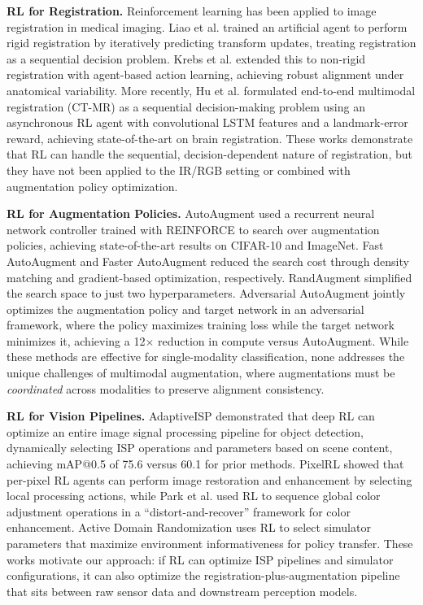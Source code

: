 \documentclass[12pt]{article}
\begin{document}
\textbf{RL for Registration.} Reinforcement learning has been applied to image registration in medical imaging. Liao et al. \citep{Liao2017ArtificialAgent} trained an artificial agent to perform rigid registration by iteratively predicting transform updates, treating registration as a sequential decision problem. Krebs et al. \citep{Krebs2017RobustRL} extended this to non-rigid registration with agent-based action learning, achieving robust alignment under anatomical variability. More recently, Hu et al. \citep{Hu2021MultimodalRegistrationRL} formulated end-to-end multimodal registration (CT-MR) as a sequential decision-making problem using an asynchronous RL agent with convolutional LSTM features and a landmark-error reward, achieving state-of-the-art on brain registration. These works demonstrate that RL can handle the sequential, decision-dependent nature of registration, but they have not been applied to the IR/RGB setting or combined with augmentation policy optimization.

\textbf{RL for Augmentation Policies.} AutoAugment \citep{Cubuk2019AutoAugment} used a recurrent neural network controller trained with REINFORCE to search over augmentation policies, achieving state-of-the-art results on CIFAR-10 and ImageNet. Fast AutoAugment \citep{Lim2019FastAutoAugment} and Faster AutoAugment \citep{Hataya2020FasterAutoAugment} reduced the search cost through density matching and gradient-based optimization, respectively. RandAugment \citep{Cubuk2020RandAugment} simplified the search space to just two hyperparameters. Adversarial AutoAugment \citep{Zhang2020AdversarialAutoAugment} jointly optimizes the augmentation policy and target network in an adversarial framework, where the policy maximizes training loss while the target network minimizes it, achieving a 12$\times$ reduction in compute versus AutoAugment. While these methods are effective for single-modality classification, none addresses the unique challenges of multimodal augmentation, where augmentations must be \textit{coordinated} across modalities to preserve alignment consistency.

\textbf{RL for Vision Pipelines.} AdaptiveISP \citep{Wang2024AdaptiveISP} demonstrated that deep RL can optimize an entire image signal processing pipeline for object detection, dynamically selecting ISP operations and parameters based on scene content, achieving mAP@0.5 of 75.6 versus 60.1 for prior methods. PixelRL \citep{Furuta2020PixelRL} showed that per-pixel RL agents can perform image restoration and enhancement by selecting local processing actions, while Park et al. \citep{Park2018DistortRecover} used RL to sequence global color adjustment operations in a ``distort-and-recover'' framework for color enhancement. Active Domain Randomization \citep{Mehta2020ActiveDR} uses RL to select simulator parameters that maximize environment informativeness for policy transfer. These works motivate our approach: if RL can optimize ISP pipelines and simulator configurations, it can also optimize the registration-plus-augmentation pipeline that sits between raw sensor data and downstream perception models.
\end{document}
